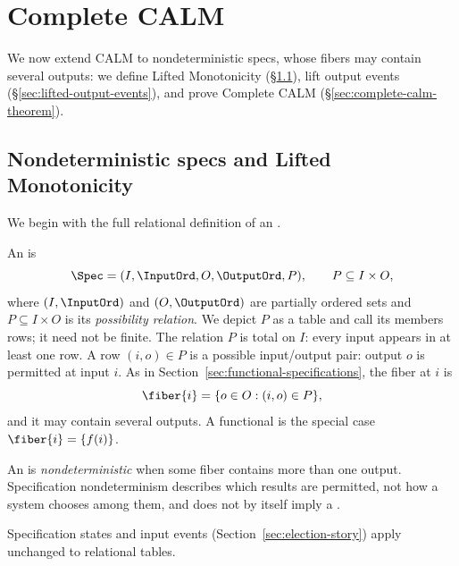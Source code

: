 \section{Complete CALM}
\label{sec:complete-calm}

We now extend CALM to nondeterministic specs, whose fibers may contain several outputs: we define Lifted Monotonicity (\S\ref{sec:relational-specifications}), lift output events (\S\ref{sec:lifted-output-events}), and prove Complete CALM (\S\ref{sec:complete-calm-theorem}).

\subsection{Nondeterministic specs and Lifted Monotonicity}
\label{sec:relational-specifications}

We begin with the full relational definition of an \spectype.
\begin{definition}[\Spectype]
\label{def:relational-specification}
An \emph{\spectype} is
        \begin{equation}
  \Spec=(I,\InputOrd,O,\OutputOrd,P),
  \qquad P\subseteq I\times O,
  \label{eq:relational-specification}
        \end{equation}
  where $(I,\InputOrd)$ and $(O,\OutputOrd)$ are partially ordered sets and
  $P\subseteq I\times O$ is its \emph{possibility relation}.  We depict $P$ as
a table and call its members rows; it need not be finite.  The relation $P$
  is total on $I$: every input appears in at least one row.  A row $(i,o)\in P$
  is a possible input/output pair: output $o$ is permitted at input $i$.  As in
  Section~\ref{sec:functional-specifications}, the fiber at $i$ is
        \begin{equation}
  \fiber{i}=\{o\in O:(i,o)\in P\},
  \label{eq:fiber}
        \end{equation}
  and it may contain several outputs.  A functional \spectype is the special
  case $\fiber{i}=\{f(i)\}$.
\end{definition}

\begin{definition}
\label{def:nondeterministic}
An \spectype is \emph{nondeterministic} when some fiber
contains more than one output.  Specification nondeterminism describes
which results are permitted, not how a system chooses among them, and does not
by itself imply a \commitment.
\end{definition}

Specification states and input events
(Section~\ref{sec:election-story})
apply unchanged to relational tables.

